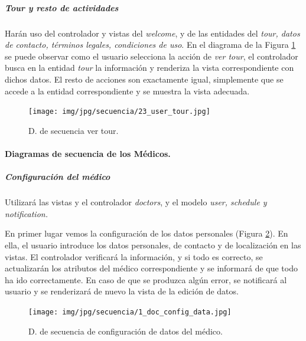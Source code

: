 \documentclass[a4paper,oneside,11pt]{book}
\begin{document}
				
				\subparagraph{Tour y resto de actividades} %
				\label{subp:tour_y_resto_de_actividades}
				
					Harán uso del controlador y vistas del \textit{welcome}, y de las entidades del \textit{tour, datos de contacto, términos legales, condiciones de uso}. En el diagrama de la Figura \ref{fig:cont_user_tour} se puede observar como el usuario selecciona la acción de \textit{ver tour}, el controlador busca en la entidad \textit{tour} la información y renderiza la vista correspondiente con dichos datos. El resto de acciones son exactamente igual, simplemente que se accede a la entidad correspondiente y se muestra la vista adecuada.
					
					\begin{figure}[H]
					  \centering
					    \texttt{[image: img/jpg/secuencia/23\_user\_tour.jpg]}
					  \caption{D. de secuencia ver tour.}
					  \label{fig:cont_user_tour}
					\end{figure}
				
			
			
			\paragraph{Diagramas de secuencia de los Médicos.} %
			\label{par:diagramas_de_secuencia_de_los_medicos_}
			
				\subparagraph{Configuración del médico} %
				\label{subp:cont_configuracion_doc}
				
					Utilizará las vistas y el controlador \textit{doctors}, y el modelo \textit{user, schedule y notification.}
					
					En primer lugar vemos la configuración de los datos personales (Figura \ref{fig:cont_doc_config_data}). En ella, el usuario introduce los datos personales, de contacto y de localización en las vistas. El controlador verificará la información, y si todo es correcto, se actualizarán los atributos del médico correspondiente y se informará de que todo ha ido correctamente. En caso de que se produzca algún error, se notificará al usuario y se renderizará de nuevo la vista de la edición de datos.
					
					\begin{figure}[H]
					  \centering
					    \texttt{[image: img/jpg/secuencia/1\_doc\_config\_data.jpg]}
					  \caption{D. de secuencia de configuración de datos del médico.}
					  \label{fig:cont_doc_config_data}
					\end{figure}
					
\end{document}
